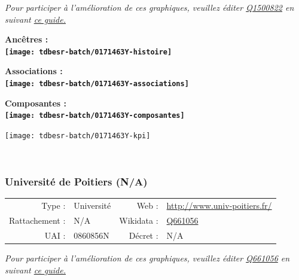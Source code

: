\documentclass[12pt,french,]{article}
\begin{document}
\textit{\scriptsize Pour participer à l'amélioration de ces graphiques, veuillez éditer  \href{https://www.wikidata.org/entity/Q1500822}{Q1500822}  en suivant \href{https://github.com/cpesr/wikidataESR/blob/master/Rmd/wikidataESR.md}{ce guide.}}

\vspace{1cm}  
\begin{minipage}[b]{0.50\textwidth}\begin{center} \bf Ancêtres : \\  
\texttt{[image: tdbesr-batch/0171463Y-histoire]} \end{center}\end{minipage}\begin{minipage}[b]{0.50\textwidth}\begin{center} \bf Associations : \\  
\texttt{[image: tdbesr-batch/0171463Y-associations]} \end{center}\end{minipage}

\hrulefill

\begin{center} \bf Composantes : \\  
\texttt{[image: tdbesr-batch/0171463Y-composantes]} \end{center}

\begin{center}\texttt{[image: tdbesr-batch/0171463Y-kpi]} \end{center}\checkoddpage

\ifoddpage \fi ~\newpage  

\hypertarget{universituxe9-de-poitiers-na}{%
\subsubsection{Université de Poitiers
(N/A)}\label{universituxe9-de-poitiers-na}}

\begin{tabular*}{\textwidth}{rp{5cm}rl}  
\hline  
Type : & Université & Web : &\href{http://www.univ-poitiers.fr/}{http://www.univ-poitiers.fr/} \\  
Rattachement : & N/A & Wikidata : & \href{https://www.wikidata.org/entity/Q661056}{Q661056} \\  
UAI : & 0860856N & Décret : & N/A \\  
\hline  
\end{tabular*}

\textit{\scriptsize Pour participer à l'amélioration de ces graphiques, veuillez éditer  \href{https://www.wikidata.org/entity/Q661056}{Q661056}  en suivant \href{https://github.com/cpesr/wikidataESR/blob/master/Rmd/wikidataESR.md}{ce guide.}}
\end{document}
